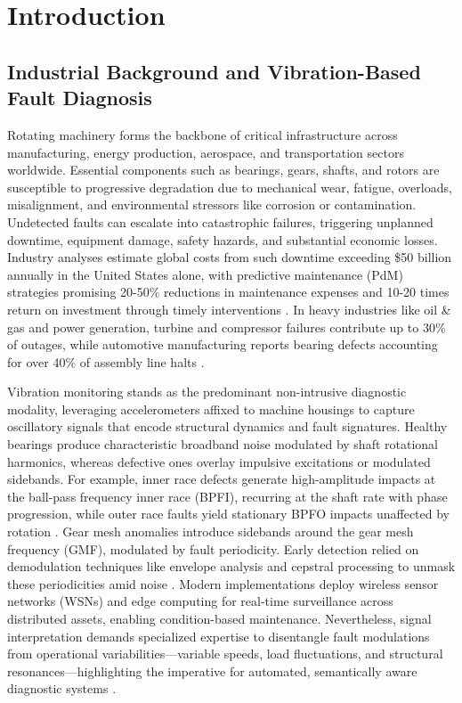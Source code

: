 \section{Introduction}

\subsection{Industrial Background and Vibration-Based Fault Diagnosis}

Rotating machinery forms the backbone of critical infrastructure across manufacturing, energy production, aerospace, and transportation sectors worldwide. Essential components such as bearings, gears, shafts, and rotors are susceptible to progressive degradation due to mechanical wear, fatigue, overloads, misalignment, and environmental stressors like corrosion or contamination. Undetected faults can escalate into catastrophic failures, triggering unplanned downtime, equipment damage, safety hazards, and substantial economic losses. Industry analyses estimate global costs from such downtime exceeding \$50 billion annually in the United States alone, with predictive maintenance (PdM) strategies promising 20-50\% reductions in maintenance expenses and 10-20 times return on investment through timely interventions \cite{cite1}\cite{cite22}. In heavy industries like oil \& gas and power generation, turbine and compressor failures contribute up to 30\% of outages, while automotive manufacturing reports bearing defects accounting for over 40\% of assembly line halts \cite{cite23}.

Vibration monitoring stands as the predominant non-intrusive diagnostic modality, leveraging accelerometers affixed to machine housings to capture oscillatory signals that encode structural dynamics and fault signatures. Healthy bearings produce characteristic broadband noise modulated by shaft rotational harmonics, whereas defective ones overlay impulsive excitations or modulated sidebands. For example, inner race defects generate high-amplitude impacts at the ball-pass frequency inner race (BPFI), recurring at the shaft rate with phase progression, while outer race faults yield stationary BPFO impacts unaffected by rotation \cite{cite2}. Gear mesh anomalies introduce sidebands around the gear mesh frequency (GMF), modulated by fault periodicity. Early detection relied on demodulation techniques like envelope analysis and cepstral processing to unmask these periodicities amid noise \cite{cite3}. Modern implementations deploy wireless sensor networks (WSNs) and edge computing for real-time surveillance across distributed assets, enabling condition-based maintenance. Nevertheless, signal interpretation demands specialized expertise to disentangle fault modulations from operational variabilities—variable speeds, load fluctuations, and structural resonances—highlighting the imperative for automated, semantically aware diagnostic systems \cite{cite4}\cite{cite24}.


